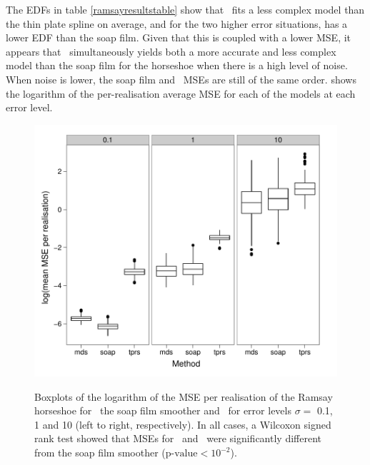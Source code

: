 {The EDFs in table \ref{ramsayresultstable} show that \mdsap\ fits a less complex model than the thin plate spline on average, and for the two higher error situations, has a lower EDF than the soap film. Given that this is coupled with a lower MSE, it appears that \mdsap\ simultaneously yields both a more accurate and less complex model than the soap film for the horseshoe when there is a high level of noise. When noise is lower, the soap film and \mdsap\ MSEs are still of the same order.  shows the logarithm of the per-realisation average MSE for each of the models at each error level.

\begin{figure}
\centering
\includegraphics[width=6in]{mds/figs/mds-ramsay-boxplot.pdf} \\
\caption{Boxplots of the logarithm of the MSE per realisation of the Ramsay horseshoe for \mdsap\, the soap film smoother and \tprs\ for error levels $\sigma=$ 0.1, 1 and 10 (left to right, respectively). In all cases, a Wilcoxon signed rank test showed that MSEs for \mdsap\ and \tprs\ were significantly different from the soap film smoother ($\text{p-value} < 10^{-2}$).}
\label{mds-ramsay-boxplot}
\end{figure}

}
